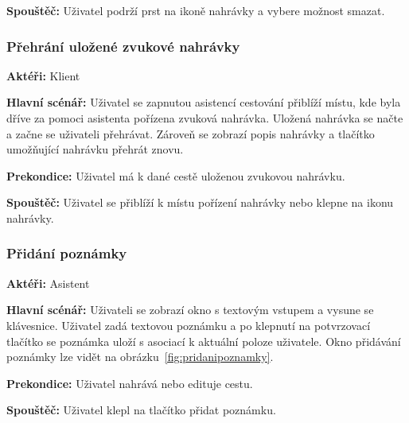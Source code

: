\documentclass[czech,master,public,dept460,male,java,cpdeclaration]{diploma}
\newcommand{\usecase}[2]{\subsubsection{#1}\label{#2}}
\begin{document}
\vspace{0.1cm}
\noindent
\textbf{Spouštěč:} Uživatel podrží prst na ikoně nahrávky a vybere možnost smazat.

\usecase{Přehrání uložené zvukové nahrávky}{prehraninahravky}
\textbf{Aktéři:} Klient

\vspace{0.1cm}
\noindent
\textbf{Hlavní scénář:} Uživatel se zapnutou asistencí cestování přiblíží místu,
kde byla dříve za pomoci asistenta pořízena zvuková nahrávka. Uložená nahrávka se načte
a začne se uživateli přehrávat. Zároveň se zobrazí popis nahrávky a tlačítko umožňující
nahrávku přehrát znovu.

\vspace{0.1cm}
\noindent
\textbf{Prekondice:} Uživatel má k dané cestě uloženou zvukovou nahrávku.

\vspace{0.1cm}
\noindent
\textbf{Spouštěč:} Uživatel se přiblíží k místu pořízení nahrávky nebo klepne na ikonu nahrávky.

\usecase{Přidání poznámky}{pridanipoznamky}
\textbf{Aktéři:} Asistent

\vspace{0.1cm}
\noindent
\textbf{Hlavní scénář:} Uživateli se zobrazí okno s textovým vstupem a vysune se klávesnice. Uživatel
zadá textovou poznámku a po klepnutí na potvrzovací tlačítko se poznámka uloží s asociací k aktuální poloze
uživatele. Okno přidávání poznámky lze vidět na obrázku~\ref{fig:pridanipoznamky}.

\vspace{0.1cm}
\noindent
\textbf{Prekondice:} Uživatel nahrává nebo edituje cestu.

\vspace{0.1cm}
\noindent
\textbf{Spouštěč:} Uživatel klepl na tlačítko přidat poznámku.
\end{document}
